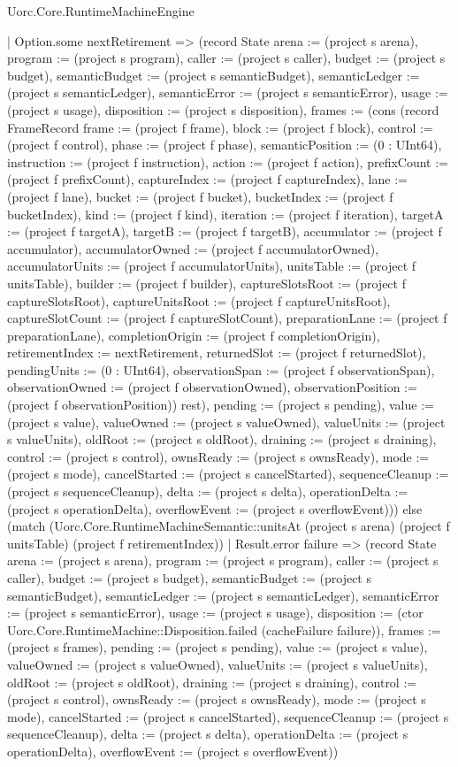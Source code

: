 \begin{lexlean}{Uorc.Core.RuntimeMachineEngine}
\begin{semanticmodule}
{          | Option.some nextRetirement => (record State {arena := (project s arena), program := (project s program), caller := (project s caller), budget := (project s budget), semanticBudget := (project s semanticBudget), semanticLedger := (project s semanticLedger), semanticError := (project s semanticError), usage := (project s usage), disposition := (project s disposition), frames := (cons (record FrameRecord {frame := (project f frame), block := (project f block), control := (project f control), phase := (project f phase), semanticPosition := (0 : UInt64), instruction := (project f instruction), action := (project f action), prefixCount := (project f prefixCount), captureIndex := (project f captureIndex), lane := (project f lane), bucket := (project f bucket), bucketIndex := (project f bucketIndex), kind := (project f kind), iteration := (project f iteration), targetA := (project f targetA), targetB := (project f targetB), accumulator := (project f accumulator), accumulatorOwned := (project f accumulatorOwned), accumulatorUnits := (project f accumulatorUnits), unitsTable := (project f unitsTable), builder := (project f builder), captureSlotsRoot := (project f captureSlotsRoot), captureUnitsRoot := (project f captureUnitsRoot), captureSlotCount := (project f captureSlotCount), preparationLane := (project f preparationLane), completionOrigin := (project f completionOrigin), retirementIndex := nextRetirement, returnedSlot := (project f returnedSlot), pendingUnits := (0 : UInt64), observationSpan := (project f observationSpan), observationOwned := (project f observationOwned), observationPosition := (project f observationPosition)}) rest), pending := (project s pending), value := (project s value), valueOwned := (project s valueOwned), valueUnits := (project s valueUnits), oldRoot := (project s oldRoot), draining := (project s draining), control := (project s control), ownsReady := (project s ownsReady), mode := (project s mode), cancelStarted := (project s cancelStarted), sequenceCleanup := (project s sequenceCleanup), delta := (project s delta), operationDelta := (project s operationDelta), overflowEvent := (project s overflowEvent)})) else (match (Uorc.Core.RuntimeMachineSemantic::unitsAt (project s arena) (project f unitsTable) (project f retirementIndex))
          | Result.error failure => (record State {arena := (project s arena), program := (project s program), caller := (project s caller), budget := (project s budget), semanticBudget := (project s semanticBudget), semanticLedger := (project s semanticLedger), semanticError := (project s semanticError), usage := (project s usage), disposition := (ctor Uorc.Core.RuntimeMachine::Disposition.failed (cacheFailure failure)), frames := (project s frames), pending := (project s pending), value := (project s value), valueOwned := (project s valueOwned), valueUnits := (project s valueUnits), oldRoot := (project s oldRoot), draining := (project s draining), control := (project s control), ownsReady := (project s ownsReady), mode := (project s mode), cancelStarted := (project s cancelStarted), sequenceCleanup := (project s sequenceCleanup), delta := (project s delta), operationDelta := (project s operationDelta), overflowEvent := (project s overflowEvent)})
}
\end{semanticmodule}
\end{lexlean}
